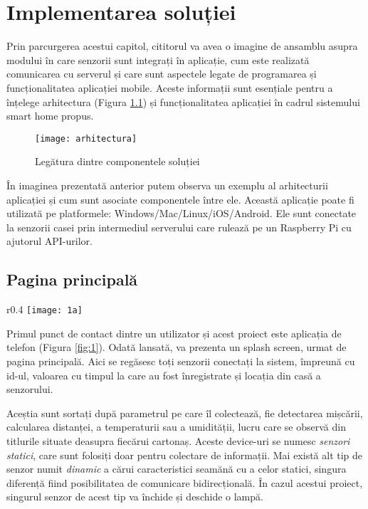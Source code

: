 \chapter{Implementarea soluției}

Prin parcurgerea acestui capitol, cititorul va avea o imagine de ansamblu asupra modului în care senzorii sunt integrați în aplicație, cum este realizată comunicarea cu serverul și care sunt aspectele legate de programarea și funcționalitatea aplicației mobile. Aceste informații sunt esențiale pentru a înțelege arhitectura (Figura \ref{fig:arhitectura}) și funcționalitatea aplicației în cadrul sistemului smart home propus.

\begin{figure}[h]
	\centering
	\texttt{[image: arhitectura]}
	\caption{Legătura dintre componentele soluției}
	\label{fig:arhitectura}
\end{figure}

În imaginea prezentată anterior putem observa un exemplu al arhitecturii aplicației și cum sunt asociate componentele între ele. Această aplicație poate fi utilizată pe platformele: Windows/Mac/Linux/iOS/Android. Ele sunt conectate la senzorii casei prin intermediul serverului care rulează pe un Raspberry Pi cu ajutorul API-urilor.

\newpage
\section{Pagina principală}

\begin{wrapfigure}{r}{0.4\textwidth}
	\texttt{[image: 1a]}
	\caption{Pagina principală}
	\label{fig:1}
\end{wrapfigure}

Primul punct de contact dintre un utilizator și acest proiect este aplicația de telefon (Figura \ref{fig:1}). Odată lansată, va prezenta un splash screen, urmat de pagina principală. Aici se regăsesc toți senzorii conectați la sistem, împreună cu id-ul, valoarea cu timpul la care au fost înregistrate și locația din casă a senzorului. 

Aceștia sunt sortați după parametrul pe care îl colectează, fie detectarea mișcării, calcularea distanței, a temperaturii sau a umidității, lucru care se observă din titlurile situate deasupra fiecărui cartonaș. Aceste device-uri se numesc \emph{senzori statici}, care sunt folosiți doar pentru colectare de informații. Mai există alt tip de senzor numit \emph{dinamic} a cărui caracteristici seamănă cu a celor statici, singura diferență fiind posibilitatea de comunicare bidirecțională. În cazul acestui proiect, singurul senzor de acest tip va închide și deschide o lampă.

